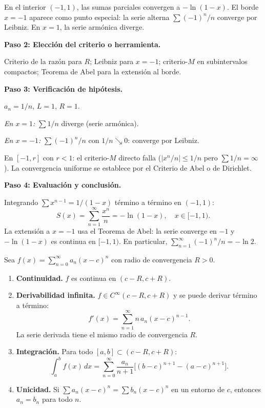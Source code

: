 \begin{example}
\begin{myproof}
En el interior $(-1,1)$, las sumas parciales convergen a $-\ln(1-x)$.
El borde $x=-1$ aparece como punto especial: la serie alterna
$\sum(-1)^n/n$ converge por Leibniz. En $x=1$, la serie armónica
diverge.

\textbf{Paso 2: Elección del criterio o herramienta.}

Criterio de la razón para $R$; Leibniz para $x=-1$; criterio-$M$ en
subintervalos compactos; Teorema de Abel para la extensión al borde.

\textbf{Paso 3: Verificación de hipótesis.}

$a_n = 1/n$, $L = 1$, $R = 1$.

\emph{En $x=1$:} $\sum 1/n$ diverge (serie armónica).

\emph{En $x=-1$:} $\sum(-1)^n/n$ con $1/n\searrow 0$: converge por Leibniz.

En $[-1,r]$ con $r<1$: el criterio-$M$ directo falla ($|x^n/n|\leq 1/n$
pero $\sum 1/n = \infty$). La convergencia uniforme se establece por
el Criterio de Abel o de Dirichlet.

\textbf{Paso 4: Evaluación y conclusión.}

Integrando $\sum x^{n-1} = 1/(1-x)$ término a término en $(-1,1)$:
\[
    \boxed{S(x) = \sum_{n=1}^\infty \frac{x^n}{n}
        = -\ln(1-x), \quad x \in [-1, 1).}
\]
La extensión a $x=-1$ usa el Teorema de Abel: la serie converge en
$-1$ y $-\ln(1-x)$ es continua en $[-1,1)$. En particular,
$\sum_{n=1}^\infty (-1)^n/n = -\ln 2$.
\end{myproof}
\end{example}

\begin{theorem}
\label{thm:prop_pot}
Sea $f(x) = \sum_{n=0}^\infty a_n(x-c)^n$ con radio de convergencia
$R > 0$.
\begin{enumerate}
    \item \textbf{Continuidad.} $f$ es continua en $(c-R, c+R)$.
    \item \textbf{Derivabilidad infinita.} $f \in C^\infty(c-R,c+R)$
          y se puede derivar término a término:
          \[
              f'(x) = \sum_{n=1}^\infty n\,a_n(x-c)^{n-1}.
          \]
          La serie derivada tiene el mismo radio de convergencia $R$.
    \item \textbf{Integración.} Para todo $[a,b] \subset (c-R,c+R)$:
          \[
              \int_a^b f(x)\,dx
              = \sum_{n=0}^\infty
                \frac{a_n}{n+1}\bigl[(b-c)^{n+1}-(a-c)^{n+1}\bigr].
          \]
    \item \textbf{Unicidad.} Si $\sum a_n(x-c)^n = \sum b_n(x-c)^n$
          en un entorno de $c$, entonces $a_n = b_n$ para todo $n$.
\end{enumerate}
\end{theorem}

